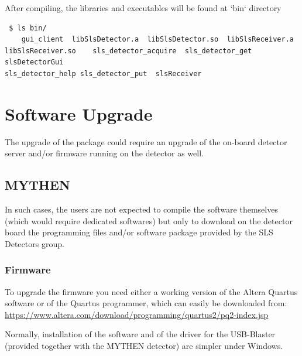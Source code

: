 \documentclass{article}
\begin{document}
After compiling, the libraries and executables will be found at `bin` directory 
\begin{verbatim}
 $ ls bin/
    gui_client  libSlsDetector.a  libSlsDetector.so  libSlsReceiver.a 
libSlsReceiver.so    sls_detector_acquire  sls_detector_get  slsDetectorGui 
sls_detector_help sls_detector_put  slsReceiver
\end{verbatim}



\section{Software Upgrade}

The upgrade of the package could require an upgrade of the on-board detector
server and/or firmware running on the detector as well. 


\subsection{MYTHEN}
In such cases, the users are not expected to compile the software
themselves (which would require dedicated softwares) but only to download on the
detector board the programming files and/or software package provided by
the SLS Detectors group.

\subsubsection{Firmware}

To upgrade the firmware you need either a working version of the Altera
Quartus software or of the Quartus programmer, which can easily be downloaded
from: \\
\url{https://www.altera.com/download/programming/quartus2/pq2-index.jsp}
\medskip

\noindent Normally, installation of the software and of the driver for the
USB-Blaster (provided together with the MYTHEN detector) are simpler under
Windows. \bigskip
\end{document}
